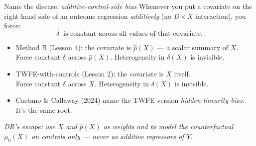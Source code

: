\documentclass[aspectratio=169,11pt]{beamer}
\begin{document}
\begin{frame}{Name the disease: \textit{additive-control-side bias}}
\vspace{0.4em}
Whenever you put a covariate on the right-hand side of an outcome regression \textit{additively} (no $D \times X$ interaction), you force:
\vspace{-0.2em}
\[
\delta \;\;\text{is constant across all values of that covariate.}
\]
\vspace{-0.4em}
\begin{itemize}\small
  \item Method B (Lesson 4): the covariate is $\widehat{p}(X)$ --- a scalar summary of $X$. \\
        Force constant $\delta$ across $\widehat{p}(X)$. Heterogeneity in $\delta(X)$ is invisible.
  \item TWFE-with-controls (Lesson 2): the covariate is $X$ itself. \\
        Force constant $\delta$ across $X$. Heterogeneity in $\delta(X)$ is invisible.
  \item {} Caetano \& Callaway (2024) name the TWFE version \textit{hidden linearity bias}. It's the same root.
\end{itemize}
\vspace{0.3em}
\begin{center}
\small\color{warmgray}\itshape
DR's escape: use $X$ and $\widehat{p}(X)$ as \textit{weights} and to model the \textit{counterfactual} $\mu_0(X)$ on controls only --- never as additive regressors of $Y$.
\end{center}
\end{frame}

\end{document}
